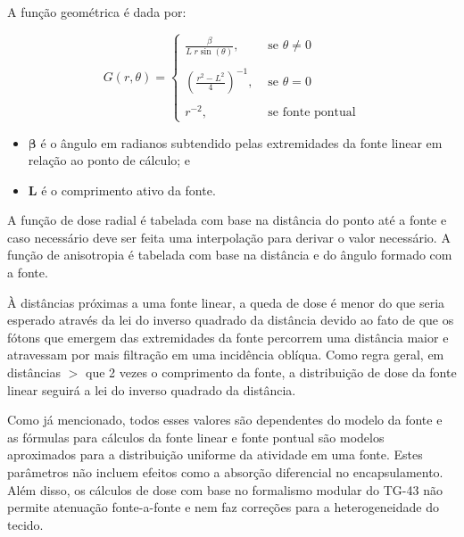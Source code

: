 \documentclass[11pt,a4paper]{article}
\newcounter{exemplo}
\begin{document}
	A função geométrica é dada por:

	$$G(r, \theta) = \begin{cases}
		\frac{\beta}{L \; r \sin(\theta)}, & \text{ se } \theta \neq 0 \\

		\\

		\left(\frac{r^2 - L^2}{4}\right)^{-1}, & \text{ se } \theta = 0 \\

		\\

		r^{-2}, & \text{ se } \text{fonte pontual}
	\end{cases}$$

	\begin{exemplo}[onde:]
		\begin{itemize}[label=\textcolor{CarnationPink}{$\star$}]
			\item \textcolor{CarnationPink}{$\mathbf{\beta}$} é o ângulo em radianos subtendido pelas extremidades da fonte linear em relação ao ponto de cálculo; e
			\item \textcolor{CarnationPink}{$\mathbf{L}$} é o comprimento ativo da fonte.
		\end{itemize}		
	\end{exemplo}

	A função de dose radial é tabelada com base na distância do ponto até a fonte e caso necessário deve ser feita uma interpolação para derivar o valor necessário. A função de anisotropia é tabelada com base na distância e do ângulo formado com a fonte. 

	À distâncias próximas a uma fonte linear, a queda de dose é menor do que seria esperado através da lei do inverso quadrado da distância devido ao fato de que os fótons que emergem das extremidades da fonte percorrem uma distância maior e atravessam por mais filtração em uma incidência oblíqua. Como regra geral, em distâncias $>$ que 2 vezes o comprimento da fonte, a distribuição de dose da fonte linear seguirá a lei do inverso quadrado da distância.

	Como já mencionado, todos esses valores são dependentes do modelo da fonte e as fórmulas para cálculos da fonte linear e fonte pontual são modelos aproximados para a distribuição uniforme da atividade em uma fonte. Estes parâmetros não incluem efeitos como a absorção diferencial no encapsulamento. Além disso, os cálculos de dose com base no formalismo modular do TG-43 não permite atenuação fonte-a-fonte e nem faz correções para a heterogeneidade do tecido. 
\end{document}
